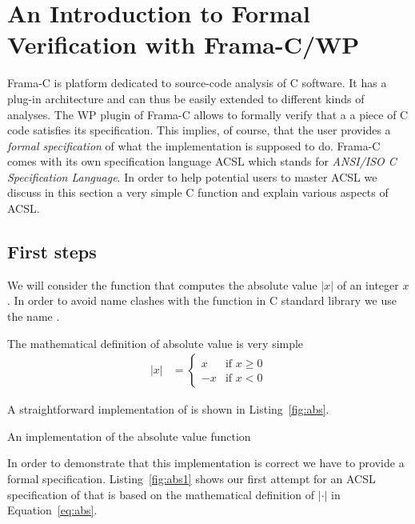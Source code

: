 
\section{An Introduction to Formal Verification with Frama-C\slash WP}
\label{sec:frama-c}

Frama-C is platform dedicated to source-code analysis of C software.
It has a plug-in architecture and can thus be easily extended to 
different kinds of analyses.
The WP plugin of Frama-C allows to formally verify that a a piece of
C code satisfies its specification.
This implies, of course, that the user provides a \emph{formal specification}
of what the implementation is supposed to do.
Frama-C comes with its own specification language ACSL which stands for
\emph{ANSI\slash ISO C Specification Language}.
In order to help potential users to master ACSL we discuss in this section 
a very simple C function and explain various aspects of ACSL.

\subsection{First steps}

We will consider the function that computes the absolute value $|x|$
of an integer $x$.
In order to avoid name clashes with the function  in C standard library
we use the name .

The mathematical definition of absolute value is very simple
\begin{align}
\label{eq:abs}
   |x| &= \left\{
            \begin{array}{rl}
               x  & \text{if $x \geq 0$} \\
               -x & \text{if $x < 0$}
            \end{array}
          \right.
\end{align}

A straightforward implementation of  is shown in Listing~\ref{fig:abs}.

\begin{listing}[hbt]
\begin{minipage}{\textwidth}

\end{minipage}
\caption{\label{fig:abs} An implementation of the absolute value function}
\end{listing}

In order to demonstrate that this implementation is correct we have to provide
a formal specification.
Listing~\ref{fig:abs1} shows our first attempt for an ACSL specification of  that
is based on the mathematical definition of $|\cdot|$ in Equation~\ref{eq:abs}.

